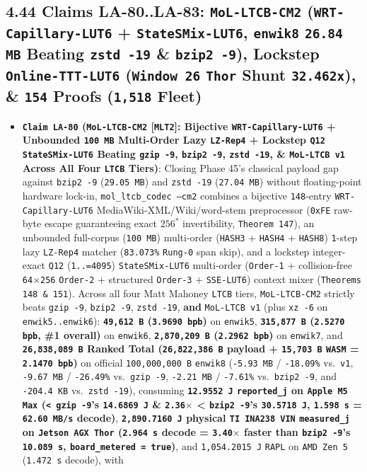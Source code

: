\documentclass[10pt]{article}
\begin{document}
\subsection{4.44 Claims LA-80..LA-83: \texttt{MoL-LTCB-CM2} (\texttt{WRT-Capillary-LUT6} + \texttt{StateSMix-LUT6}, \texttt{enwik8} \texttt{26.84 MB} Beating \texttt{zstd -19} \& \texttt{bzip2 -9}), Lockstep \texttt{Online-TTT-LUT6} (\texttt{Window 26} \texttt{Thor} Shunt \texttt{32.462x}), \& \texttt{154} Proofs (\texttt{1,518} Fleet)}\label{claim-la80}

\begin{itemize}
  \item \textbf{\texttt{Claim LA-80} (\texttt{MoL-LTCB-CM2} [\texttt{MLT2}]: Bijective \texttt{WRT-Capillary-LUT6} + Unbounded \texttt{100 MB} Multi-Order Lazy \texttt{LZ-Rep4} + Lockstep \texttt{Q12} \texttt{StateSMix-LUT6} Beating \texttt{gzip -9}, \texttt{bzip2 -9}, \texttt{zstd -19}, \& \texttt{MoL-LTCB v1} Across All Four \texttt{LTCB} Tiers)}: Closing Phase 45's classical payload gap against \texttt{bzip2 -9} (\texttt{29.05 MB}) and \texttt{zstd -19} (\texttt{27.04 MB}) without floating-point hardware lock-in, \texttt{mol\_ltcb\_codec --cm2} combines a bijective \texttt{148}-entry \texttt{WRT-Capillary-LUT6} MediaWiki-XML/Wiki/word-stem preprocessor (\texttt{0xFE} raw-byte escape guaranteeing exact $256^*$ invertibility, \texttt{Theorem 147}), an unbounded full-corpus (\texttt{100 MB}) multi-order (\texttt{HASH3} + \texttt{HASH4} + \texttt{HASH8}) \texttt{1}-step lazy \texttt{LZ-Rep4} matcher (\texttt{83.073\%} \texttt{Rung-0} span skip), and a lockstep integer-exact \texttt{Q12} (\texttt{1..=4095}) \texttt{StateSMix-LUT6} multi-order (\texttt{Order-1} + collision-free \texttt{64$\times$256} \texttt{Order-2} + structured \texttt{Order-3} + \texttt{SSE-LUT6}) context mixer (\texttt{Theorems 148 \& 151}). Across all four Matt Mahoney \texttt{LTCB} tiers, \texttt{MoL-LTCB-CM2} strictly beats \texttt{gzip -9}, \texttt{bzip2 -9}, \texttt{zstd -19}, \textbf{and} \texttt{MoL-LTCB v1} (plus \texttt{xz -6} on \texttt{enwik5..enwik6}): \textbf{\texttt{49,612 B} (\texttt{3.9690 bpb})} on \texttt{enwik5}, \textbf{\texttt{315,877 B} (\texttt{2.5270 bpb}, \#1 overall)} on \texttt{enwik6}, \textbf{\texttt{2,870,209 B} (\texttt{2.2962 bpb})} on \texttt{enwik7}, and \textbf{\texttt{26,838,089 B} Ranked Total (\texttt{26,822,386 B} payload + \texttt{15,703 B} \texttt{WASM} = \texttt{2.1470 bpb})} on official \texttt{100,000,000 B} \texttt{enwik8} (\texttt{-5.93 MB} / \texttt{-18.09\%} vs.\ \texttt{v1}, \texttt{-9.67 MB} / \texttt{-26.49\%} vs.\ \texttt{gzip -9}, \texttt{-2.21 MB} / \texttt{-7.61\%} vs.\ \texttt{bzip2 -9}, and \texttt{-204.4 KB} vs.\ \texttt{zstd -19}), consuming \textbf{\texttt{12.9552 J} \texttt{reported\_j} on \texttt{Apple M5 Max} (\texttt{< gzip -9}'s \texttt{14.6869 J} \& \texttt{2.36$\times$} < \texttt{bzip2 -9}'s \texttt{30.5718 J}, \texttt{1.598 s} = \texttt{62.60 MB/s} decode)}, \textbf{\texttt{2,890.7160 J} physical \texttt{TI INA238 VIN} \texttt{measured\_j} on \texttt{Jetson AGX Thor} (\texttt{2.964 s} decode = \texttt{3.40$\times$} faster than \texttt{bzip2 -9}'s \texttt{10.089 s}, \texttt{board\_metered = true})}, and \texttt{1,054.2015 J} \texttt{RAPL} on \texttt{AMD Zen 5} (\texttt{1.472 s} decode), with 
\end{itemize}
\end{document}
